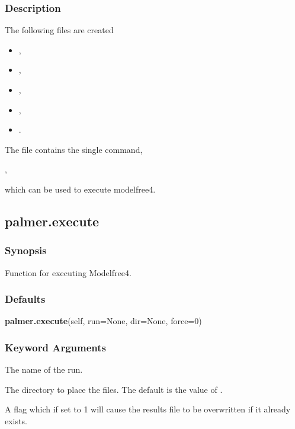 \subsubsection{Description}

The following files are created

\begin{itemize}
\item[]     
,
\item[]     
,
\item[]     
,
\item[]     
,
\item[]     
.
\end{itemize}

The file 
 contains the single command,

,

which can be used to execute modelfree4.


\newpage

\subsection{palmer.execute}


\subsubsection{Synopsis}

Function for executing Modelfree4.

\subsubsection{Defaults}

\textsf{\textbf{palmer.execute}(self, run=None, dir=None, force=0)}


\subsubsection{Keyword Arguments}


  The name of the run.

  The directory to place the files.  The default is the value of 
.

  A flag which if set to 1 will cause the results file to be overwritten if it already exists.

